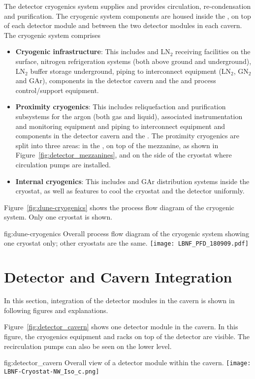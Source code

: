 The detector cryogenics system supplies  and provides
circulation, re-condensation and purification. The cryogenic system
components are housed inside the , on top of each detector module
and between the two detector modules in each cavern. The cryogenic system comprises
\begin{itemize}
\item {\bf Cryogenic infrastructure}: This includes  and LN$_2$ receiving
  facilities on the surface, nitrogen refrigeration systems (both
  above ground and underground), LN$_2$ buffer storage
  underground, piping to interconnect equipment (LN$_2$, GN$_2$ and GAr),
  components in the detector cavern and the  and process control/support
  equipment.
\item {\bf Proximity cryogenics}: This includes reliquefaction 
  and purification subsystems for the argon (both gas and liquid), associated
  instrumentation and monitoring equipment and  piping to
  interconnect equipment and components in the detector cavern and the
  . The proximity cryogenics are split into three areas: in the
  , on top of the mezzanine, as shown in Figure~\ref{fig:detector_mezzanines},
  and on the side of the cryostat where  circulation pumps are installed.
\item {\bf Internal cryogenics}: This includes  and GAr distribution
  systems inside the cryostat, as well as features to cool the
  cryostat and the detector uniformly.
\end{itemize}
Figure~\ref{fig:dune-cryogenics} shows the process flow diagram of the
 cryogenic system. Only one cryostat is shown.
\begin{dunefigure}{fig:dune-cryogenics}
  {Overall process flow diagram of the cryogenic system showing one
    cryostat only; other cryostats are the same.}
  \texttt{[image: LBNF\_PFD\_180909.pdf]}
\end{dunefigure}


\section{Detector and Cavern Integration}
\label{sec:fdsp-coord-det-cav-integ}
In this section, integration of the detector modules in the cavern is shown in following figures and explanations.

Figure~\ref{fig:detector_cavern} shows one detector module in the
cavern. In this figure, the cryogenics equipment and racks on top of
the detector are visible. The  recirculation pumps can also be seen
on the lower level.
\begin{dunefigure}{fig:detector_cavern}
  {Overall view of a detector module within the cavern.}
  \texttt{[image: LBNF-Cryostat-NW\_Iso\_c.png]}
\end{dunefigure}


